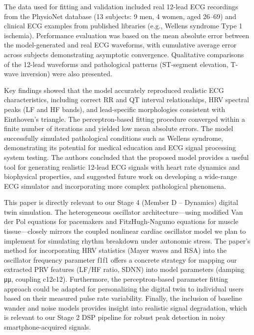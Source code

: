 The data used for fitting and validation included real 12-lead ECG recordings from the PhysioNet database (13 subjects: 9 men, 4 women, aged 26–69) and clinical ECG examples from published libraries (e.g., Wellens syndrome Type 1 ischemia). Performance evaluation was based on the mean absolute error between the model-generated and real ECG waveforms, with cumulative average error across subjects demonstrating asymptotic convergence. Qualitative comparisons of the 12-lead waveforms and pathological patterns (ST-segment elevation, T-wave inversion) were also presented.

Key findings showed that the model accurately reproduced realistic ECG characteristics, including correct RR and QT interval relationships, HRV spectral peaks (LF and HF bands), and lead-specific morphologies consistent with Einthoven’s triangle. The perceptron-based fitting procedure converged within a finite number of iterations and yielded low mean absolute errors. The model successfully simulated pathological conditions such as Wellens syndrome, demonstrating its potential for medical education and ECG signal processing system testing. The authors concluded that the proposed model provides a useful tool for generating realistic 12-lead ECG signals with heart rate dynamics and biophysical properties, and suggested future work on developing a wide-range ECG simulator and incorporating more complex pathological phenomena.

This paper is directly relevant to our Stage 4 (Member D – Dynamics) digital twin simulation. The heterogeneous oscillator architecture—using modified Van der Pol equations for pacemakers and FitzHugh-Nagumo equations for muscle tissue—closely mirrors the coupled nonlinear cardiac oscillator model we plan to implement for simulating rhythm breakdown under autonomic stress. The paper’s method for incorporating HRV statistics (Mayer waves and RSA) into the oscillator frequency parameter f1f1​ offers a concrete strategy for mapping our extracted PRV features (LF/HF ratio, SDNN) into model parameters (damping μμ, coupling c12c12​). Furthermore, the perceptron-based parameter fitting approach could be adapted for personalizing the digital twin to individual users based on their measured pulse rate variability. Finally, the inclusion of baseline wander and noise models provides insight into realistic signal degradation, which is relevant to our Stage 2 DSP pipeline for robust peak detection in noisy smartphone-acquired signals.
